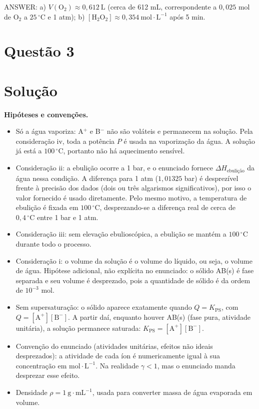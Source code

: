 \documentclass{article}%
\begin{document}
ANSWER: a) $V(\mathrm{O_2})\approx 0{,}612\ \mathrm{L}$ (cerca de 612 mL, correspondente a $0{,}025$ mol de O$_2$ a $25\,^{\circ}\mathrm{C}$ e 1 atm); b) $[\mathrm{H_2O_2}]\approx 0{,}354\ \mathrm{mol\cdot L^{-1}}$ após 5 min.%
\newpage%
\section*{Questão 3}

\section*{Solução}

\textbf{Hipóteses e convenções.}
\begin{itemize}
\item Só a água vaporiza: A$^+$ e B$^-$ não são voláteis e permanecem na solução. Pela consideração iv, toda a potência $P$ é usada na vaporização da água. A solução já está a $100\,^\circ\text{C}$, portanto não há aquecimento sensível.
\item Consideração ii: a ebulição ocorre a 1 bar, e o enunciado fornece $\Delta H_{\text{ebulição}}$ da água nessa condição. A diferença para 1 atm ($1{,}01325$ bar) é desprezível frente à precisão dos dados (dois ou três algarismos significativos), por isso o valor fornecido é usado diretamente. Pelo mesmo motivo, a temperatura de ebulição é fixada em $100\,^\circ\text{C}$, desprezando-se a diferença real de cerca de $0{,}4\,^\circ\text{C}$ entre 1 bar e 1 atm.
\item Consideração iii: sem elevação ebulioscópica, a ebulição se mantém a $100\,^\circ\text{C}$ durante todo o processo.
\item Consideração i: o volume da solução é o volume do líquido, ou seja, o volume de água. Hipótese adicional, não explícita no enunciado: o sólido AB(s) é fase separada e seu volume é desprezado, pois a quantidade de sólido é da ordem de $10^{-3}$ mol.
\item Sem supersaturação: o sólido aparece exatamente quando $Q = K_{\text{PS}}$, com $Q = [\text{A}^+][\text{B}^-]$. A partir daí, enquanto houver AB(s) (fase pura, atividade unitária), a solução permanece saturada: $K_{\text{PS}} = [\text{A}^+][\text{B}^-]$.
\item Convenção do enunciado (atividades unitárias, efeitos não ideais desprezados): a atividade de cada íon é numericamente igual à sua concentração em $\text{mol}\cdot\text{L}^{-1}$. Na realidade $\gamma < 1$, mas o enunciado manda desprezar esse efeito.
\item Densidade $\rho = 1\ \text{g}\cdot\text{mL}^{-1}$, usada para converter massa de água evaporada em volume.
\end{itemize}
\end{document}
